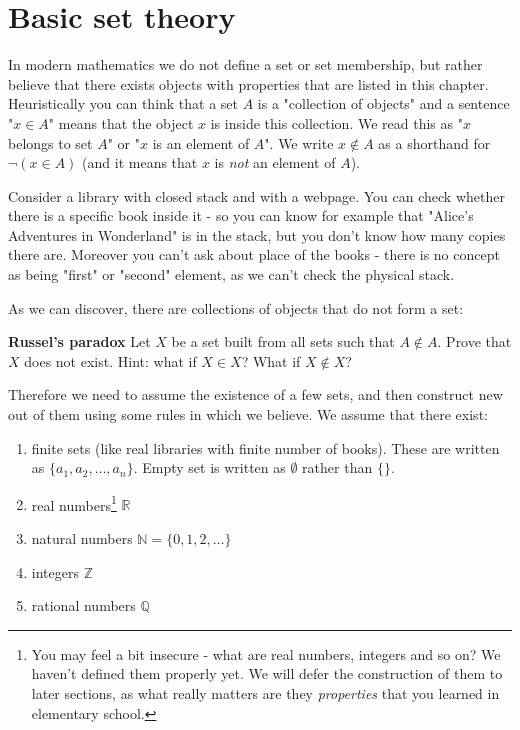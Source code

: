 \section{Basic set theory}
\label{sec:basic_set_theory}
In modern mathematics we do not define a set or set membership, but rather believe that there exists objects with properties that are listed in this chapter.
Heuristically you can think that a set $A$ is a "collection of objects" and a sentence "$x\in A$" means that the object $x$ is inside this collection. We read this as
"$x$ belongs to set $A$" or "$x$ is an element of $A$". We write $x\notin A$ as a shorthand for $\neg (x\in A)$ (and it means that $x$ is \textit{not} an element of $A$).

\begin{example}
  Consider a library with closed stack and with a webpage. You can check whether there is a specific book inside it -
  so you can know for example that "Alice's Adventures in Wonderland"
  is in the stack, but you don't know how many copies there are. Moreover you can't ask about place of the books - there is no concept as being "first" or "second" element,
  as we can't check the physical stack.
\end{example}

As we can discover, there are collections of objects that do not form a set:
\begin{prob}
  \textbf{Russel's paradox}
  Let $X$ be a set built from all sets such that $A\notin A.$ Prove that $X$ does not exist. Hint: what if $X\in X$? What if $X\notin X$?
\end{prob}

Therefore we need to assume the existence of a few sets, and then construct new out of them using some rules in which we believe. We assume that there exist:

\begin{enumerate}
  \item finite sets (like real libraries with finite number of books). These are written as $\{a_1,a_2,\dots,a_n\}$. Empty set is written as $\emptyset$ rather than $\{\}$.
	\item real numbers\footnote{You may feel a bit insecure - what are real numbers, integers and so on? We haven't defined them properly yet.
    We will defer the construction of them to later sections, as what really matters are they \textit{properties} that you learned in elementary school.} $\mathbb R$
	\item natural numbers $\mathbb N=\{0,1,2,\dots\}$
	\item integers $\mathbb Z$
	\item rational numbers $\mathbb Q$
\end{enumerate}

